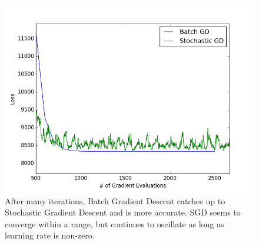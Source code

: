 \begin{figure}
	\centering
	\includegraphics [trim=0 0 0 0, clip, angle=0, width=0.8\columnwidth,
	keepaspectratio]{figures/1_3_sgd_late}
	\caption{After many iterations, Batch Gradient Descent catches up to Stochastic Gradient Descent and is more accurate. SGD seems to converge within a range, but continues to oscillate as long as learning rate is non-zero.} 
	\label{fig:1_3_sgd_late} 
\end{figure}









